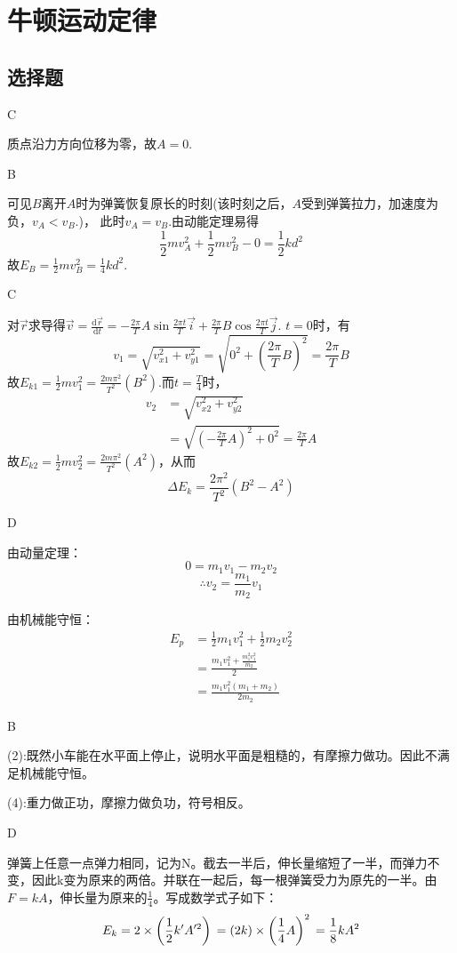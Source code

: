 \documentclass[b5paper,opensource,sourcefont,parskip]{qyxf-book}
\newcommand{\di}[1]{\mathrm{d}#1}
\begin{document}
\chapter{牛顿运动定律}
\section{选择题}

C

\solve 质点沿力方向位移为零，故$A=0$.

B

\solve 可见$B$离开$A$时为弹簧恢复原长的时刻(该时刻之后，$A$受到弹簧拉力，加速度为负，$v_A<v_B$.)，
此时$v_A=v_B$.由动能定理易得
\[\frac{1}{2}mv_A^2+\frac{1}{2}mv_B^2-0=\frac{1}{2}kd^2\]
故$E_B=\frac{1}{2}mv_B^2=\frac{1}{4}kd^2$.


C

\solve 对$\vec{r}$求导得$\vec{v}=\frac{\di{\vec{r}}}{\di{t}}=-\frac{2\pi}{T}A\sin\frac{2\pi t}{T}\vec{i}+\frac{2\pi}{T}B\cos\frac{2\pi t}{T}\vec{j}$.
$t=0$时，有
\[
v_1=\sqrt{v_{x1}^2+v_{y1}^2}=\sqrt{0^2+\left(\frac{2\pi}{T}B\right)^2}=\frac{2\pi}{T}B
\]
故$E_{k1}=\frac{1}{2}mv_1^2=\frac{2m\pi^2}{T^2}\left(B^2\right)$.而$t=\frac{T}{4}$时，
\begin{align*}
v_2&=\sqrt{v_{x2}^2+v_{y2}^2}\\
&=\sqrt{\left(-\frac{2\pi}{T}A\right)^2+0^2}=\frac{2\pi}{T}A
\end{align*}
故$E_{k2}=\frac{1}{2}mv_2^2=\frac{2m\pi^2}{T^2}\left(A^2\right)$，从而
\[\Delta{}E_k=\frac{2\pi^2}{T^2}(B^2-A^2)\]


D

\solve 由动量定理：
\[0=m_1v_1-m_2v_2\]
\[\therefore{}v_2=\frac{m_1}{m_2}v_1\]

由机械能守恒：
\begin{align*}
E_p &=\frac{1}{2}m_1v_1^2+\frac{1}{2}m_2v_2^2\\
&=\frac{m_1v_1^2+\frac{m_1^2v_1^2}{m_2}}{2}\\
&=\frac{m_1v_1^2\left(m_1+m_2\right)}{2m_2}
\end{align*}

B

\solve (2):既然小车能在水平面上停止，说明水平面是粗糙的，有摩擦力做功。因此不满足机械能守恒。

(4):重力做正功，摩擦力做负功，符号相反。

D

\solve 弹簧上任意一点弹力相同，记为N。截去一半后，伸长量缩短了一半，而弹力不变，因此k变为原来的两倍。并联在一起后，每一根弹簧受力为原先的一半。由$F=kA$，伸长量为原来的$\frac{1}{4}$。写成数学式子如下：
\[
E_k=2\times\left(\frac{1}{2}k'A'^2\right)\\=\left(2k\right)\times\left(\frac{1}{4}A\right)^2\\=\frac{1}{8}kA^2
\]
\end{document}
